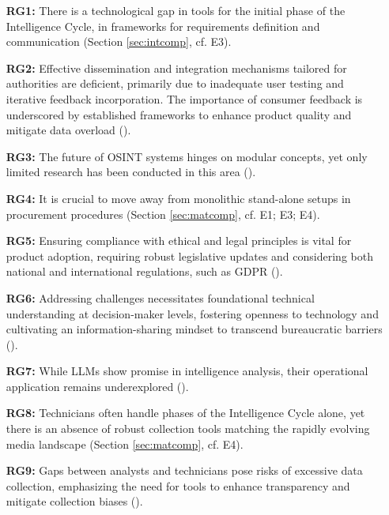 \documentclass[10pt]{article}
\begin{document}
\begin{itemize}
    \item[\textbf{RG1:}] There is a technological gap in tools for the initial phase of the Intelligence Cycle, in frameworks for requirements definition and communication (Section \ref{sec:intcomp}, cf. E3).

        \item[\textbf{RG2:}]Effective dissemination and integration mechanisms tailored for authorities are deficient, primarily due to inadequate user testing and iterative feedback incorporation. The importance of consumer feedback is underscored by established frameworks to enhance product quality and mitigate data overload (\cite{JointChiefsofStaffU.S.Army.2013, NorthAtlanticTreatyOrganization.2001}).

    \item[\textbf{RG3:}] The future of OSINT systems hinges on modular concepts, yet only limited research has been conducted in this area (\cite{Arjun.2020,Wright.2020}).

    \item[\textbf{RG4:}] It is crucial to move away from monolithic stand-alone setups in procurement procedures (Section \ref{sec:matcomp}, cf. E1; E3; E4).

    \item[\textbf{RG5:}] Ensuring compliance with ethical and legal principles is vital for product adoption, requiring robust legislative updates and considering both national and international regulations, such as GDPR (\cite{EuropeanParliament.2016,EuropeanCommission.18.08.2023,Wittmer.2022}).

    \item[\textbf{RG6:}] Addressing challenges necessitates foundational technical understanding at decision-maker levels, fostering openness to technology and cultivating an information-sharing mindset to transcend bureaucratic barriers (\cite{NorthAtlanticTreatyOrganization.2001}).

    \item[\textbf{RG7:}] While LLMs show promise in intelligence analysis, their operational application remains underexplored (\cite{Radford.2023}).

    \item[\textbf{RG8:}] Technicians often handle phases of the Intelligence Cycle alone, yet there is an absence of robust collection tools matching the rapidly evolving media landscape (Section \ref{sec:matcomp}, cf. E4).

    \item[\textbf{RG9:}] Gaps between analysts and technicians pose risks of excessive data collection, emphasizing the need for tools to enhance transparency and mitigate collection biases (\cite{Lowenthal.2020}).
\end{itemize}
\end{document}

